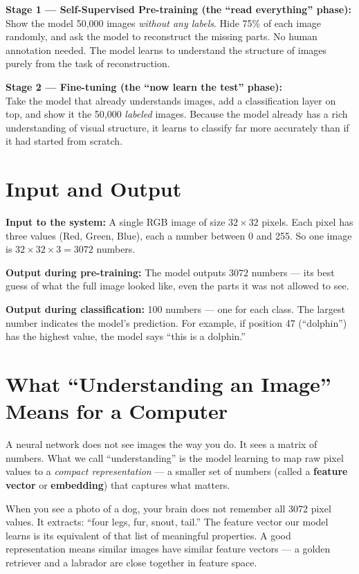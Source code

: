 \documentclass[12pt, a4paper]{report}
\begin{document}
\begin{conceptbox}
\textbf{Stage 1 — Self-Supervised Pre-training (the ``read everything'' phase):}\\
Show the model 50,000 images \emph{without any labels}. Hide 75\% of each image randomly, and ask the model to reconstruct the missing parts. No human annotation needed. The model learns to understand the structure of images purely from the task of reconstruction.

\medskip
\textbf{Stage 2 — Fine-tuning (the ``now learn the test'' phase):}\\
Take the model that already understands images, add a classification layer on top, and show it the 50,000 \emph{labeled} images. Because the model already has a rich understanding of visual structure, it learns to classify far more accurately than if it had started from scratch.
\end{conceptbox}

\section{Input and Output}

\textbf{Input to the system:} A single RGB image of size $32 \times 32$ pixels. Each pixel has three values (Red, Green, Blue), each a number between 0 and 255. So one image is $32 \times 32 \times 3 = 3072$ numbers.

\textbf{Output during pre-training:} The model outputs $3072$ numbers — its best guess of what the full image looked like, even the parts it was not allowed to see.

\textbf{Output during classification:} 100 numbers — one for each class. The largest number indicates the model's prediction. For example, if position 47 (``dolphin'') has the highest value, the model says ``this is a dolphin.''

\section{What ``Understanding an Image'' Means for a Computer}

A neural network does not see images the way you do. It sees a matrix of numbers. What we call ``understanding'' is the model learning to map raw pixel values to a \emph{compact representation} — a smaller set of numbers (called a \textbf{feature vector} or \textbf{embedding}) that captures what matters.

\begin{intuitionbox}
When you see a photo of a dog, your brain does not remember all 3072 pixel values. It extracts: ``four legs, fur, snout, tail.'' The feature vector our model learns is its equivalent of that list of meaningful properties. A good representation means similar images have similar feature vectors — a golden retriever and a labrador are close together in feature space.
\end{intuitionbox}
\end{document}
